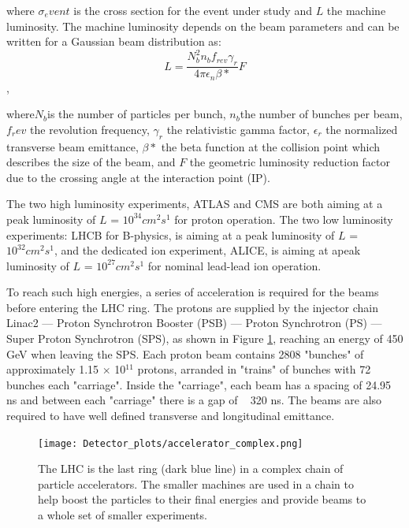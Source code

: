 \documentclass[letterpaper,12pt]{article}
\begin{document}
	where $\sigma_event$ is the cross section 
	for the event under study and $L$ the machine luminosity. 
	The machine luminosity depends on the beam parameters 
	and can be written for a Gaussian beam distribution as:
	\[
	L = \frac{N_b^2 n_b f_{rev} \gamma_r}{4\pi \epsilon_n \beta*} F	
	\],

	where$N_b$is the number of particles per bunch,
	$n_b$the number of bunches per beam,
	$f_rev$ the revolution frequency, 
	$\gamma_r$ the relativistic gamma factor, 
	$\epsilon_r$ the normalized transverse beam emittance, $\beta*$ the beta function at the collision point which
	describes the size of the beam, and	$F$ the geometric luminosity reduction factor due to the 
	crossing angle at the interaction point (IP).

	The two high luminosity experiments, ATLAS and CMS are
	both aiming at a peak luminosity of $L$ = $10^{34}cm^2s^1$ for proton operation.
	The two low luminosity experiments: LHCB for 
	B-physics, is aiming at a peak luminosity of $L$ = $10^{32}cm^2s^1$, 
	and the dedicated ion experiment, ALICE, is aiming at apeak luminosity of
	$L$ = $10^{27}cm^2s^1$ for nominal lead-lead ion operation.

	To reach such high energies, a series of acceleration is required for the beams before
	entering the LHC ring. The protons are supplied by the injector chain 
	Linac2 — Proton Synchrotron Booster (PSB) — Proton Synchrotron (PS) — Super Proton Synchrotron (SPS), 
	as shown in Figure \ref{fig:accelerator_complex}, 
	reaching an energy of 450 GeV when leaving the SPS. 
	Each proton beam contains 2808 "bunches" of approximately 1.15 $\times$ 10$^11$ protons, arranded in 
	"trains" of bunches with 72 bunches each "carriage". Inside the "carriage", each beam has
	a spacing of 24.95 ns and between each "carriage" there is a gap of ~ 320 ns. The beams are also 
	required to have well defined transverse and longitudinal emittance. 



	\begin{figure}[]
		\begin{centering}	
		\texttt{[image: Detector\_plots/accelerator\_complex.png]}
		\caption{The LHC is the last ring (dark blue line) in a complex chain of 
		particle accelerators. The smaller machines are used in a chain to help boost 
		the particles to their final energies and provide beams to a whole set of smaller experiments.
			}
		\label{fig:accelerator_complex}
		\end{centering}
	\end{figure}
\end{document}
